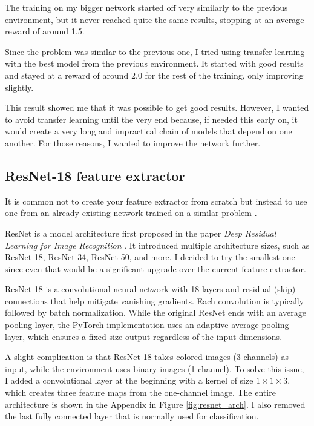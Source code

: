 \documentclass[
  digital,     %
  oneside,     %
  nosansbold,  %
  nocolorbold, %
  lof,         %
  lot,         %
]{fithesis4}
\begin{document}
The training on my bigger network started off very similarly to the previous environment, but it never reached quite the same results, stopping at an average reward of around 1.5.

Since the problem was similar to the previous one, I tried using transfer learning with the best model from the previous environment. It started with good results and stayed at a reward of around 2.0 for the rest of the training, only improving slightly.

This result showed me that it was possible to get good results. However, I wanted to avoid transfer learning until the very end because, if needed this early on, it would create a very long and impractical chain of models that depend on one another. For those reasons, I wanted to improve the network further.

\subsection{ResNet-18 feature extractor}
\label{subsec:resnet}

It is common not to create your feature extractor from scratch but instead to use one from an already existing network trained on a similar problem \cite[p. 256]{DLforVisualSystems}.

ResNet is a model architecture first proposed in the paper \textit{Deep Residual Learning for Image Recognition} \cite{ResNet18}. It introduced multiple architecture sizes, such as ResNet-18, ResNet-34, ResNet-50, and more. I decided to try the smallest one since even that would be a significant upgrade over the current feature extractor.

ResNet-18 is a convolutional neural network with 18 layers and residual (skip) connections that help mitigate vanishing gradients. Each convolution is typically followed by batch normalization. While the original ResNet ends with an average pooling layer, the PyTorch implementation uses an adaptive average pooling layer, which ensures a fixed-size output regardless of the input dimensions.

A slight complication is that ResNet-18 takes colored images (3 channels) as input, while the environment uses binary images (1 channel). To solve this issue, I added a convolutional layer at the beginning with a kernel of size $1\times1\times3$, which creates three feature maps from the one-channel image. The entire architecture is shown in the Appendix in Figure \ref{fig:resnet_arch}. I also removed the last fully connected layer that is normally used for classification.
\end{document}
